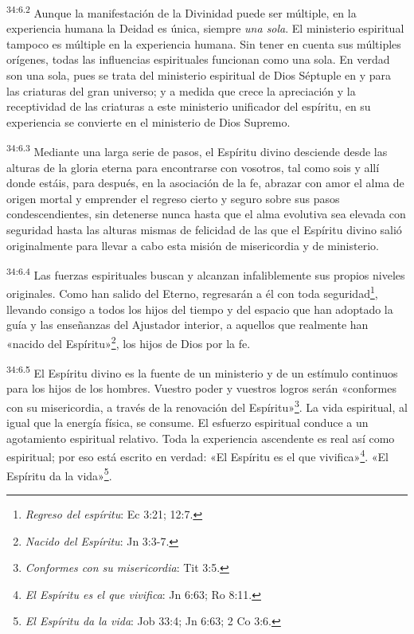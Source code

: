 \par
\textsuperscript{34:6.2} Aunque la manifestación de la Divinidad puede ser múltiple, en la experiencia humana la Deidad es única, siempre \textit{una sola}. El ministerio espiritual tampoco es múltiple en la experiencia humana. Sin tener en cuenta sus múltiples orígenes, todas las influencias espirituales funcionan como una sola. En verdad son una sola, pues se trata del ministerio espiritual de Dios Séptuple en y para las criaturas del gran universo; y a medida que crece la apreciación y la receptividad de las criaturas a este ministerio unificador del espíritu, en su experiencia se convierte en el ministerio de Dios Supremo.

\par
\textsuperscript{34:6.3} Mediante una larga serie de pasos, el Espíritu divino desciende desde las alturas de la gloria eterna para encontrarse con vosotros, tal como sois y allí donde estáis, para después, en la asociación de la fe, abrazar con amor el alma de origen mortal y emprender el regreso cierto y seguro sobre sus pasos condescendientes, sin detenerse nunca hasta que el alma evolutiva sea elevada con seguridad hasta las alturas mismas de felicidad de las que el Espíritu divino salió originalmente para llevar a cabo esta misión de misericordia y de ministerio.

\par
\textsuperscript{34:6.4} Las fuerzas espirituales buscan y alcanzan infaliblemente sus propios niveles originales. Como han salido del Eterno, regresarán a él con toda seguridad\footnote{\textit{Regreso del espíritu}: Ec 3:21; 12:7.}, llevando consigo a todos los hijos del tiempo y del espacio que han adoptado la guía y las enseñanzas del Ajustador interior, a aquellos que realmente han «nacido del Espíritu»\footnote{\textit{Nacido del Espíritu}: Jn 3:3-7.}, los hijos de Dios por la fe.

\par
\textsuperscript{34:6.5} El Espíritu divino es la fuente de un ministerio y de un estímulo continuos para los hijos de los hombres. Vuestro poder y vuestros logros serán «conformes con su misericordia, a través de la renovación del Espíritu»\footnote{\textit{Conformes con su misericordia}: Tit 3:5.}. La vida espiritual, al igual que la energía física, se consume. El esfuerzo espiritual conduce a un agotamiento espiritual relativo. Toda la experiencia ascendente es real así como espiritual; por eso está escrito en verdad: «El Espíritu es el que vivifica»\footnote{\textit{El Espíritu es el que vivifica}: Jn 6:63; Ro 8:11.}. «El Espíritu da la vida»\footnote{\textit{El Espíritu da la vida}: Job 33:4; Jn 6:63; 2 Co 3:6.}.

